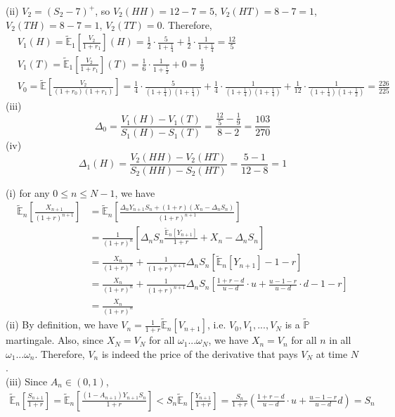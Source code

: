 \documentclass[12pt]{article}
\newenvironment{problem}[2][Problem]{\begin{trivlist}
		\item[\hskip \labelsep {\bfseries #1}\hskip \labelsep {\bfseries #2.}]}{\end{trivlist}}
\begin{document}
	(ii) $V_2 = (S_2-7)^+$, so $V_2(HH) = 12-7=5$, $V_2(HT) = 8-7 = 1$, $V_2(TH)=8-7 = 1$, $V_2(TT)=0$. Therefore,
	\begin{align*}
	&V_1(H) = \tilde{\mathbb{E}}_1\left[\frac{V_2}{1+r_1}\right](H) = \frac{1}{2}\cdot\frac{5}{1+\frac{1}{4}}+\frac{1}{2}\cdot\frac{1}{1+\frac{1}{4}}=\frac{12}{5}\\
	&V_1(T) = \tilde{\mathbb{E}}_1\left[\frac{V_2}{1+r_1}\right](T) = \frac{1}{6}\cdot\frac{1}{1+\frac{1}{2}}+0=\frac{1}{9}\\
	&V_0 =\tilde{\mathbb{E}}\left[\frac{V_2}{(1+r_0)(1+r_1)}\right]=\frac{1}{4}\cdot\frac{5}{(1+\frac{1}{4})(1+\frac{1}{4})}+\frac{1}{4}\cdot\frac{1}{(1+\frac{1}{4})(1+\frac{1}{4})}+\frac{1}{12}\cdot\frac{1}{(1+\frac{1}{4})(1+\frac{1}{2})}=\frac{226}{225}
	\end{align*}
	(iii) $$\Delta_0 = \frac{V_1(H)-V_1(T)}{S_1(H)-S_1(T)} = \frac{\frac{12}{5}-\frac{1}{9}}{8-2} = \frac{103}{270}$$
	(iv) $$\Delta_1(H) = \frac{V_2(HH)-V_2(HT)}{S_2(HH)-S_2(HT)} = \frac{5-1}{12-8} = 1$$
	\begin{problem}{10}\end{problem}
	(i) for any $0\le n\le N-1$, we have
	\begin{align*}
	\tilde{\mathbb{E}}_n\left[\frac{X_{n+1}}{(1+r)^{n+1}}\right] &= \tilde{\mathbb{E}}_n\left[\frac{\Delta_nY_{n+1}S_n + (1+r)(X_n-\Delta_n S_n)}{(1+r)^{n+1}}\right]\\
	&=\frac{1}{(1+r)^n}\left[\Delta_n S_n \frac{\tilde{\mathbb{E}}_n[Y_{n+1}]}{1+r}+X_n-\Delta_nS_n \right]\\
	&=\frac{X_n}{(1+r)^n}+\frac{1}{(1+r)^{n+1}}\Delta_nS_n\left[\tilde{\mathbb{E}}_n[Y_{n+1}]-1-r\right]\\
	&=\frac{X_n}{(1+r)^n}+\frac{1}{(1+r)^{n+1}}\Delta_nS_n\left[\frac{1+r-d}{u-d}\cdot u +\frac{u-1-r}{u-d}\cdot d -1-r\right]\\
	&=\frac{X_n}{(1+r)^n}
	\end{align*}
	(ii) By definition, we have $V_{n}=\frac{1}{1+r}\tilde{\mathbb{E}}_n[V_{n+1}]$, i.e. $V_0,V_1,...,V_N$ is a $\tilde{\mathbb{P}}$ martingale. Also, since $X_N = V_N$ for all $\omega_1...\omega_N$, we have $X_n = V_n$ for all $n$ in all $\omega_1...\omega_n$. Therefore, $V_n$ is indeed the price of the derivative that pays $V_N$ at time $N$. \\
	(iii) Since $A_n\in(0,1)$,\begin{align*}
	\tilde{\mathbb{E}}_n\left[\frac{S_{n+1}}{1+r}\right] = \tilde{\mathbb{E}}_n\left[\frac{(1-A_{n+1})Y_{n+1}S_n}{1+r}\right] < S_n\tilde{\mathbb{E}}_n\left[\frac{Y_{n+1}}{1+r}\right] = \frac{S_n}{1+r}\left(\frac{1+r-d}{u-d}\cdot u+\frac{u-1-r}{u-d}d\right)=S_n
	\end{align*}
\end{document}
